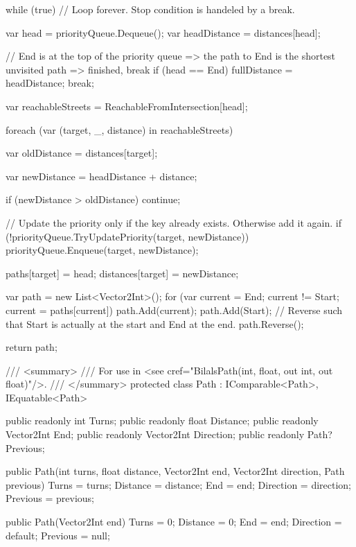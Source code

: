 \documentclass{article}
\theoremstyle{nonumberplain}
\begin{document}
\begin{lstcs}[]
{{        while (true) // Loop forever. Stop condition is handeled by a break.
        {
            var head = priorityQueue.Dequeue();
            var headDistance = distances[head];

            // End is at the top of the priority queue => the path to End is the shortest unvisited path => finished, break
            if (head == End)
            {
                fullDistance = headDistance;
                break;
            }

            var reachableStreets = ReachableFromIntersection[head];

            foreach (var (target, _, distance) in reachableStreets)
            {
                var oldDistance = distances[target];

                var newDistance = headDistance + distance;

                if (newDistance > oldDistance) continue;

                // Update the priority only if the key already exists. Otherwise add it again.
                if (!priorityQueue.TryUpdatePriority(target, newDistance)) priorityQueue.Enqueue(target, newDistance);

                paths[target] = head;
                distances[target] = newDistance;
            }
        }

        var path = new List<Vector2Int>();
        for (var current = End; current != Start; current = paths[current]) path.Add(current);
        path.Add(Start);
        // Reverse such that Start is actually at the start and End at the end.
        path.Reverse();

        return path;
    }

    /// <summary>
    /// For use in <see cref="BilalsPath(int, float, out int, out float)"/>.
    /// </summary>
    protected class Path : IComparable<Path>, IEquatable<Path>
    {
        public readonly int Turns;
        public readonly float Distance;
        public readonly Vector2Int End;
        public readonly Vector2Int Direction;
        public readonly Path? Previous;

        public Path(int turns, float distance, Vector2Int end, Vector2Int direction, Path previous)
        {
            Turns = turns;
            Distance = distance;
            End = end;
            Direction = direction;
            Previous = previous;
        }

        public Path(Vector2Int end)
        {
            Turns = 0;
            Distance = 0;
            End = end;
            Direction = default;
            Previous = null;
        }

}}
\end{lstcs}
\end{document}
